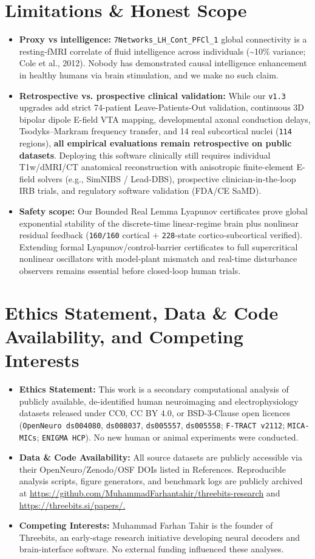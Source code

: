 \documentclass[11pt,a4paper]{article}
\begin{document}
\section{Limitations \& Honest Scope}
\begin{itemize}
\item \textbf{Proxy vs intelligence:} \texttt{7Networks\_LH\_Cont\_PFCl\_1} global connectivity is a resting-fMRI correlate of fluid intelligence across individuals (\textasciitilde{}10\% variance; Cole et al., 2012). Nobody has demonstrated causal intelligence enhancement in healthy humans via brain stimulation, and we make no such claim.
\item \textbf{Retrospective vs. prospective clinical validation:} While our \texttt{v1.3} upgrades add strict 74-patient Leave-Patients-Out validation, continuous 3D bipolar dipole E-field VTA mapping, developmental axonal conduction delays, Tsodyks--Markram frequency transfer, and 14 real subcortical nuclei (\texttt{114} regions), \textbf{all empirical evaluations remain retrospective on public datasets}. Deploying this software clinically still requires individual T1w/dMRI/CT anatomical reconstruction with anisotropic finite-element E-field solvers (e.g., SimNIBS / Lead-DBS), prospective clinician-in-the-loop IRB trials, and regulatory software validation (FDA/CE SaMD).
\item \textbf{Safety scope:} Our Bounded Real Lemma Lyapunov certificates prove global exponential stability of the discrete-time linear-regime brain plus nonlinear residual feedback (\texttt{160/160} cortical + \texttt{228}-state cortico-subcortical verified). Extending formal Lyapunov/control-barrier certificates to full supercritical nonlinear oscillators with model-plant mismatch and real-time disturbance observers remains essential before closed-loop human trials.
\end{itemize}
\section*{Ethics Statement, Data \& Code Availability, and Competing Interests}
\begin{itemize}
\item \textbf{Ethics Statement:} This work is a secondary computational analysis of publicly available, de-identified human neuroimaging and electrophysiology datasets released under CC0, CC BY 4.0, or BSD-3-Clause open licences (\texttt{OpenNeuro ds004080}, \texttt{ds008037}, \texttt{ds005557}, \texttt{ds005558}; \texttt{F-TRACT v2112}; \texttt{MICA-MICs}; \texttt{ENIGMA HCP}). No new human or animal experiments were conducted.
\item \textbf{Data \& Code Availability:} All source datasets are publicly accessible via their OpenNeuro/Zenodo/OSF DOIs listed in References. Reproducible analysis scripts, figure generators, and benchmark logs are publicly archived at \url{https://github.com/MuhammadFarhantahir/threebits-research} and \url{https://threebits.si/papers/.}
\item \textbf{Competing Interests:} Muhammad Farhan Tahir is the founder of Threebits, an early-stage research initiative developing neural decoders and brain-interface software. No external funding influenced these analyses.
\end{itemize}
\end{document}
